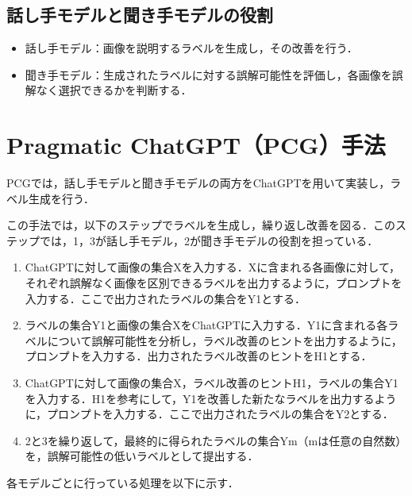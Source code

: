 \documentclass[a4paper,11pt]{jreport}
\begin{document}
\subsection{話し手モデルと聞き手モデルの役割}

\begin{itemize}
  \item 話し手モデル：画像を説明するラベルを生成し，その改善を行う．
  \item 聞き手モデル：生成されたラベルに対する誤解可能性を評価し，各画像を誤解なく選択できるかを判断する．
\end{itemize}


\section{Pragmatic ChatGPT（PCG）手法}

PCGでは，話し手モデルと聞き手モデルの両方をChatGPTを用いて実装し，ラベル生成を行う．

この手法では，以下のステップでラベルを生成し，繰り返し改善を図る．このステップでは，1，3が話し手モデル，2が聞き手モデルの役割を担っている．

\begin{enumerate}
  \item ChatGPTに対して画像の集合Xを入力する．Xに含まれる各画像に対して，それぞれ誤解なく画像を区別できるラベルを出力するように，プロンプトを入力する．ここで出力されたラベルの集合をY1とする．
  \item ラベルの集合Y1と画像の集合XをChatGPTに入力する．Y1に含まれる各ラベルについて誤解可能性を分析し，ラベル改善のヒントを出力するように，プロンプトを入力する．出力されたラベル改善のヒントをH1とする．
  \item ChatGPTに対して画像の集合X，ラベル改善のヒントH1，ラベルの集合Y1を入力する．H1を参考にして，Y1を改善した新たなラベルを出力するように，プロンプトを入力する．ここで出力されたラベルの集合をY2とする．
  \item 2と3を繰り返して，最終的に得られたラベルの集合Ym（mは任意の自然数）を，誤解可能性の低いラベルとして提出する．
\end{enumerate}

各モデルごとに行っている処理を以下に示す．
\end{document}
